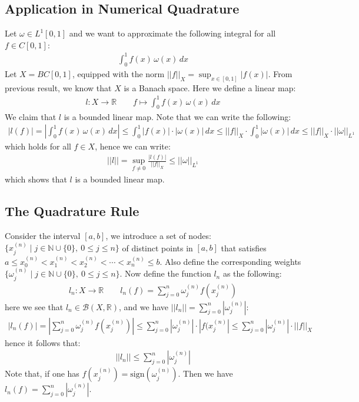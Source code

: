 \documentclass[11pt]{book}
\theoremstyle{break}
\theoremstyle{break}
\newcommand{\R}{\mathbb{R}}
\newcommand{\N}{\mathbb{N}}
\begin{document}
\subsection{Application in Numerical Quadrature}
Let $\omega \in L^1[0,1]$ and we want to approximate the following integral for all $f \in C[0,1]$:
\begin{align*}
\int_0^1 f(x)\, \omega (x) \, dx
\end{align*}
Let $X = BC[0,1]$, equipped with the norm $||f||_X = \sup_{x\in [0,1]}|f(x)|$. From previous result, we know that $X$ is a Banach space. Here we define a linear map:
\begin{align*}
l:X \to \R \qquad f\mapsto \int_0^1 f(x)\, \omega(x) \, dx
\end{align*}
We claim that $l$ is a bounded linear map. Note that we can write the following:
\begin{align*}
|l(f)| = \left| \int_0^1 f(x)\, \omega(x) \, dx\right| \leq \int_0^1 |f(x)|\cdot |\omega (x)| \, dx \leq ||f||_X \cdot \int_0^1 |\omega(x)|\, dx \leq ||f||_X \cdot ||\omega||_{L^1}
\end{align*}
which holds for all $f \in X$, hence we can write:
\begin{align*}
||l|| = \sup_{f \neq 0}\frac{|l(f)|}{||f||_X} \leq ||\omega ||_{L^1}
\end{align*}
which shows that $l$ is a bounded linear map. 

\subsection*{The Quadrature Rule}
Consider the interval $[a,b]$, we introduce a set of nodes: 
$\{ x_j^{(n)} \mid j\in \N\cup\{0\}, \ 0\leq j\leq n\}$ of distinct points in $[a,b]$ that satisfies $a \leq x_0^{(n)} <  x_1^{(n)} <  x_2^{(n)}< \cdots <  x_n^{(n)} \leq b$. Also define the corresponding weights $\{ \omega_j^{(n)} \mid j\in \N\cup\{0\}, \ 0\leq j\leq n\}$. Now define the function $l_n$ as the following:
\begin{align*}
l_n:X \to \R \qquad l_n(f) = \sum_{j=0}^n \omega_j^{(n)} f(x_j^{(n)})
\end{align*}
here we see that $l_n \in \mathcal{B}(X,\R)$, and we have $||l_n|| = \sum_{j=0}^n |\omega_j^{(n)}|$:
\begin{align*}
|l_n(f) | = \left|\sum_{j=0}^n \omega_j^{(n)} f(x_j^{(n)}) \right| \leq \sum_{j=0}^n |\omega_j^{(n)}| \cdot |f(x_j^{(n)}| \leq \sum_{j=0}^n | \omega_j^{(n)}|\cdot ||f||_X 
\end{align*}
hence it follows that:
\begin{align*}
||l_n|| \leq \sum_{j=0}^{n}|\omega_j^{(n)}|
\end{align*}
Note that, if one has $f(x_{j}^{(n)}) = \text{sign}(\omega_j^{(n)})$. Then we have $l_n(f) = \sum_{j=0}^n |\omega_j^{(n)}|$. 
\end{document}
